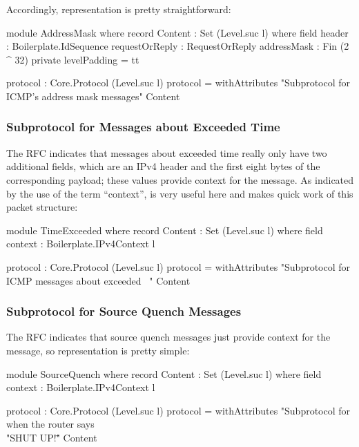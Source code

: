 \documentclass{report}
\begin{document}
Accordingly, representation is pretty straightforward:

\begin{code}
    module AddressMask where
      record Content : Set (Level.suc l) where
        field
          header : Boilerplate.IdSequence
          requestOrReply : RequestOrReply
          addressMask : Fin (2 ^ 32)
        private
          levelPadding = tt

      protocol : Core.Protocol (Level.suc l)
      protocol = withAttributes "Subprotocol for ICMP's address mask messages"
                                Content
\end{code}

\subsubsection{Subprotocol for Messages about Exceeded Time}
The RFC indicates that messages about exceeded time really only have two additional fields, which are an IPv4 header and the first eight bytes of the corresponding payload; these values provide context for the message.  As indicated by the use of the term ``context'',  is very useful here and makes quick work of this packet structure:

\begin{code}
    module TimeExceeded where
      record Content : Set (Level.suc l) where
        field
          context : Boilerplate.IPv4Context l

      protocol : Core.Protocol (Level.suc l)
      protocol = withAttributes "Subprotocol for ICMP messages about exceeded \
                                \time"
                                Content
\end{code}

\subsubsection{Subprotocol for Source Quench Messages}
The RFC indicates that source quench messages just provide context for the message, so representation is pretty simple:

\begin{code}
    module SourceQuench where
      record Content : Set (Level.suc l) where
        field
          context : Boilerplate.IPv4Context l

      protocol : Core.Protocol (Level.suc l)
      protocol = withAttributes "Subprotocol for when the router says \
                                \\"SHUT UP!\""
                                Content
\end{code}
\end{document}
